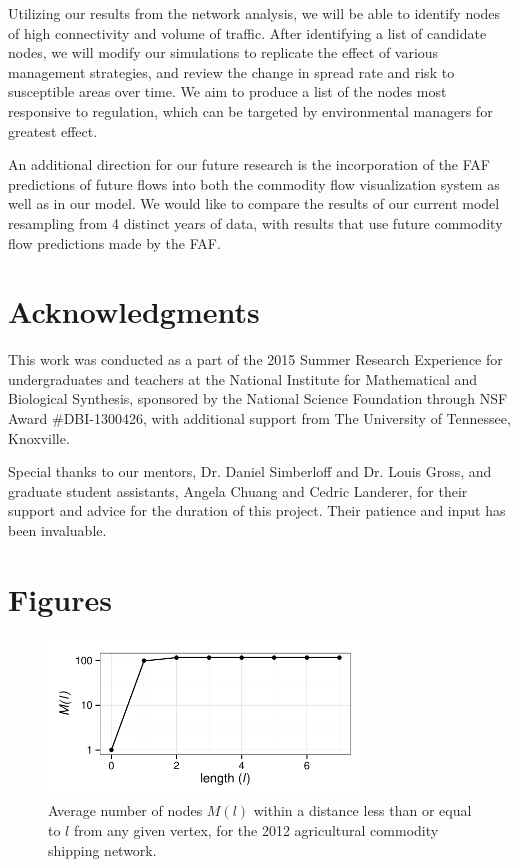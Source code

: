 \documentclass[12pt]{article}
\begin{document}
Utilizing our results from the network analysis, we will be able to identify nodes of high connectivity and volume of traffic. After identifying a list of candidate nodes, we will modify our simulations to replicate the effect of various management strategies, and review the change in spread rate and risk to susceptible areas over time. We aim to produce a list of the nodes most responsive to regulation, which can be targeted by environmental managers for greatest effect.

An additional direction for our future research is the incorporation of the FAF predictions of future flows into both the commodity flow visualization system as well as in our model. We would like to compare the results of our current model resampling from 4 distinct years of data, with results that use future commodity flow predictions made by the FAF.

\section*{Acknowledgments}
This work was conducted as a part of the 2015 Summer Research Experience for undergraduates and teachers at the National Institute for Mathematical and Biological Synthesis, sponsored by the National Science Foundation through NSF Award \#DBI-1300426, with additional support from The University of Tennessee, Knoxville.

Special thanks to our mentors, Dr. Daniel Simberloff and Dr. Louis Gross, and graduate student assistants, Angela Chuang and Cedric Landerer, for their support and advice for the duration of this project.  Their patience and input has been invaluable. 




\section*{Figures}

\begin{figure}[h]
	\centering
	\includegraphics[width=0.75\textwidth]{length_plot.pdf}
	\caption{Average number of nodes $M(l)$ within a distance less than or equal to $l$ from any given vertex, for the 2012 agricultural commodity shipping network.}
	\label{fig:plot length}
\end{figure}
\end{document}
